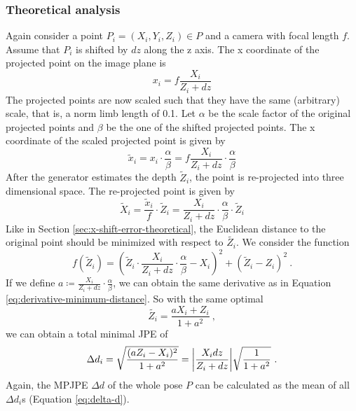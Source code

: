 \subsubsection{Theoretical analysis}
Again consider a point $P_i=(X_i, Y_i, Z_i) \in P$ and a camera with focal length $f$. Assume that $P_i$ is shifted by $dz$ along the z axis.
The x coordinate of the projected point on the image plane is
\begin{equation}
	x_i = f \frac{X_i}{Z_i + dz}
\end{equation}
The projected points are now scaled such that they have the same (arbitrary) scale, that is, a norm limb length of 0.1.
Let $\alpha$ be the scale factor of the original projected points and $\beta$ be the one of the shifted projected points. 
The x coordinate of the scaled projected point is given by
\begin{equation}
		\widetilde{x}_i = x_i \cdot \frac{\alpha}{\beta} 
		= f \frac{X_i}{Z_i + dz}\cdot \frac{\alpha}{\beta} 
\end{equation}
After the generator estimates the depth $\widetilde{Z}_i$, the point is re-projected into three dimensional space.
The re-projected point is given by
\begin{equation}
	\widetilde{X}_i = \frac{\widetilde{x}_i}{f} \cdot \widetilde{Z}_i
	= \frac{X_i}{Z_i + dz}\cdot \frac{\alpha}{\beta}  \cdot \widetilde{Z}_i
\end{equation}
Like in Section \ref{sec:x-shift-error-theoretical}, the Euclidean distance to the original point should be minimized with respect to $\widetilde{Z_i}$.
We consider the function
\begin{equation}
	f(\widetilde{Z}_i) = \left ( \widetilde{Z}_i \cdot \frac{X_i}{Z_i + dz}\cdot \frac{\alpha}{\beta} - X_i \right)^2 + ( \widetilde{Z}_i - Z_i )^2 \ .
\end{equation}
If we define $a \coloneqq \frac{X_i}{Z_i + dz}\cdot \frac{\alpha}{\beta}$, we can obtain the same derivative as in Equation \eqref{eq:derivative-minimum-distance}.
So with the same optimal 
\begin{equation}
	\widetilde{Z_i} = \frac{a X_i + Z_i}{1 + a^2} \ ,
\end{equation}
we can obtain a total minimal JPE of 
\begin{equation}
	\label{eq:z-shift-error}
	\Delta d_i = \sqrt{\frac{(a Z_i - X_i)^2}{1 + a^2}} 
	= \abs{\frac{X_i dz}{Z_i + dz}} \sqrt{\frac{1}{1 + a^2}} \ .
\end{equation}
Again, the MPJPE $\Delta d$ of the whole pose $P$ can be calculated as the mean of all $\Delta d_i$s (Equation \eqref{eq:delta-d}).

